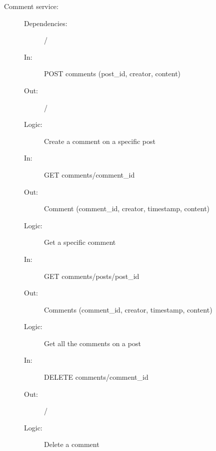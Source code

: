 \documentclass{article}
\begin{document}
\begin{description}
    \item [Comment service:]
    \begin{description}
        \item[]
        \item[Dependencies:] /
    \end{description}
    \begin{description}
        \item[]
        \item[In:] POST comments (post\_id, creator, content)
        \item[Out:] /
        \item[Logic:] Create a comment on a specific post
        \item[]

        \item[In:] GET comments/comment\_id
        \item[Out:] Comment (comment\_id, creator, timestamp, content)
        \item[Logic:] Get a specific comment
        \item[]

        \item[In:] GET comments/posts/post\_id
        \item[Out:] Comments (comment\_id, creator, timestamp, content)
        \item[Logic:] Get all the comments on a post
        \item[]

        \item[In:] DELETE comments/comment\_id
        \item[Out:] /
        \item[Logic:] Delete a comment
        \item[]
    \end{description}
\end{description}
\end{document}
